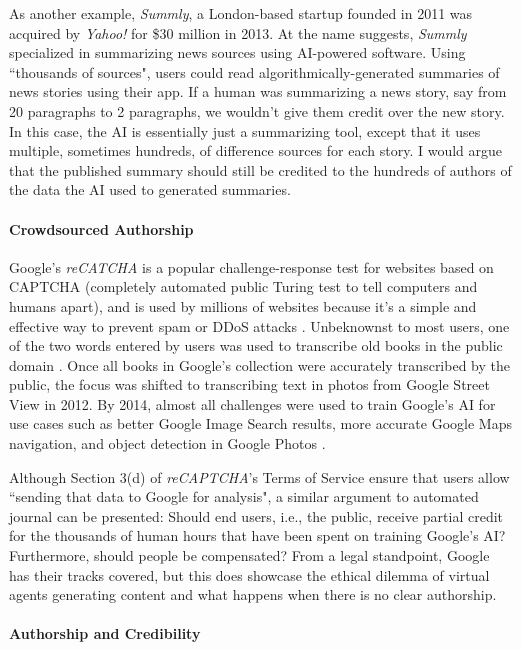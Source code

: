 \documentclass{article}
\begin{document}
As another example, \emph{Summly}, a London-based startup founded in 2011 was acquired by \emph{Yahoo!} for \$30 million in 2013. At the name suggests, \emph{Summly} specialized in summarizing news sources using AI-powered software. Using ``thousands of sources", users could read algorithmically-generated summaries of news stories using their app. If a human was summarizing a news story, say from 20 paragraphs to 2 paragraphs, we wouldn't give them credit over the new story. In this case, the AI is essentially just a summarizing tool, except that it uses multiple, sometimes hundreds, of difference sources for each story. I would argue that the published summary should still be credited to the hundreds of authors of the data the AI used to generated summaries.

\paragraph{Crowdsourced Authorship}

Google's \emph{reCATCHA} is a popular challenge-response test for websites based on CAPTCHA (completely automated public Turing test to tell computers and humans apart), and is used by millions of websites because it's a simple and effective way to prevent spam or DDoS attacks \cite{poongodi_intrusion_2019}. Unbeknownst to most users, one of the two words entered by users was used to transcribe old books in the public domain \cite{january_2018_captcha_nodate}. Once all books in Google's collection were accurately transcribed by the public, the focus was shifted to transcribing text in photos from Google Street View in 2012. By 2014, almost all challenges were used to train Google's AI for use cases such as better Google Image Search results, more accurate Google Maps navigation, and object detection in Google Photos \cite{noauthor_im_nodate}.

Although Section 3(d) of \emph{reCAPTCHA}'s Terms of Service ensure that users allow ``sending that data to Google for analysis", a similar argument to automated journal can be presented: Should end users, i.e., the public, receive partial credit for the thousands of human hours that have been spent on training Google's AI? Furthermore, should people be compensated? From a legal standpoint, Google has their tracks covered, but this does showcase the ethical dilemma of virtual agents generating content and what happens when there is no clear authorship.

\paragraph{Authorship and Credibility}
\end{document}
